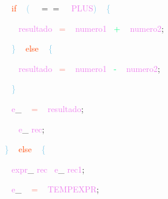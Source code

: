 \documentclass[8, usernames, dvipsnames]{beamer}
\begin{document}
\begin{frame}
\textcolor{White}{\   }
\textcolor{White}{\   }
\textcolor{OrangeRed}{if}
\textcolor{White}{\ }
\textcolor{SkyBlue}{(}
\textcolor{White}{\ }
\textcolor{OliveGreen}{$==$}
\textcolor{White}{\ }
\textcolor{Violet}{PLUS}\textcolor{SkyBlue}{)}
\textcolor{White}{\ }
\textcolor{SkyBlue}{\{ }

 \textcolor{White}{\   }
\textcolor{White}{\   }
\textcolor{White}{\   }
\textcolor{Violet}{resultado}\textcolor{White}{\ }
\textcolor{Salmon}{=}
\textcolor{White}{\ }
\textcolor{Violet}{numero1}\textcolor{White}{\ }
\textcolor{SpringGreen}{+}
\textcolor{White}{\ }
\textcolor{Violet}{numero2}\textcolor{Sepia}{;}

 \textcolor{White}{\   }
\textcolor{White}{\   }
\textcolor{SkyBlue}{\} }
\textcolor{White}{\ }
\textcolor{OrangeRed}{else}
\textcolor{White}{\ }
\textcolor{SkyBlue}{\{ }

 \textcolor{White}{\   }
\textcolor{White}{\   }
\textcolor{White}{\   }
\textcolor{Violet}{resultado}\textcolor{White}{\ }
\textcolor{Salmon}{=}
\textcolor{White}{\ }
\textcolor{Violet}{numero1}\textcolor{White}{\ }
\textcolor{SpringGreen}{-}
\textcolor{White}{\ }
\textcolor{Violet}{numero2}\textcolor{Sepia}{;}

 \textcolor{White}{\   }
\textcolor{White}{\   }
\textcolor{SkyBlue}{\} }

 \textcolor{White}{\   }
\textcolor{White}{\   }
\textcolor{Violet}{e}\textcolor{Sepia}{\_}
\textcolor{White}{\ }
\textcolor{Salmon}{=}
\textcolor{White}{\ }
\textcolor{Violet}{resultado}\textcolor{Sepia}{;}

 \textcolor{White}{\   }
\textcolor{White}{\   }
\textcolor{OrangeRed}{	}
\textcolor{White}{\ }
\textcolor{Violet}{e}\textcolor{Sepia}{\_}
\textcolor{Violet}{rec}\textcolor{Sepia}{;}

 \textcolor{White}{\   }
\textcolor{SkyBlue}{\} }
\textcolor{White}{\ }
\textcolor{OrangeRed}{else}
\textcolor{White}{\ }
\textcolor{SkyBlue}{\{ }

 \textcolor{White}{\   }
\textcolor{White}{\   }
\textcolor{Violet}{expr}\textcolor{Sepia}{\_}
\textcolor{Violet}{rec}\textcolor{White}{\ }
\textcolor{Violet}{e}\textcolor{Sepia}{\_}
\textcolor{Violet}{rec1}\textcolor{Sepia}{;}

 \textcolor{White}{\   }
\textcolor{White}{\   }
\textcolor{Violet}{e}\textcolor{Sepia}{\_}
\textcolor{White}{\ }
\textcolor{Salmon}{=}
\textcolor{White}{\ }
\textcolor{Violet}{TEMPEXPR}\textcolor{Sepia}{;}

 \end{frame}
\end{document}
